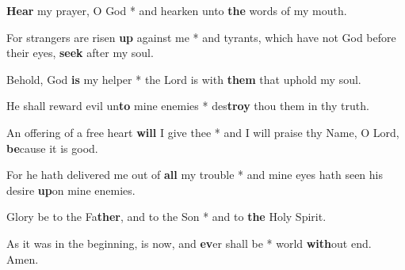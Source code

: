 \begin{multicols}{2}
	\textbf{Hear} my prayer, O God * and hearken unto \textbf{the} words of my mouth.
	
	For strangers are risen \textbf{up} against me * and tyrants, which have not God before their eyes, \textbf{seek} after my soul.
	
	Behold, God \textbf{is} my helper * the Lord is with \textbf{them} that uphold my soul.
	
	He shall reward evil un\textbf{to} mine enemies * des\textbf{troy} thou them in thy truth.
	
	An offering of a free heart \textbf{will} I give thee * and I will praise thy Name, O Lord, \textbf{be}cause it is good.
	
	For he hath delivered me out of \textbf{all} my trouble * and mine eyes hath seen his desire \textbf{up}on mine enemies.
	
	Glory be to the Fa\textbf{ther}, and to the Son * and to \textbf{the} Holy Spirit.
	
	As it was in the beginning, is now, and \textbf{ev}er shall be * world \textbf{with}out end. Amen.
\end{multicols}